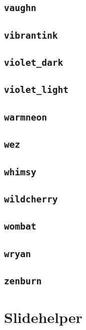 \subsection{\texttt{vaughn}}
\newpage
\subsection{\texttt{vibrantink}}
\newpage
\subsection{\texttt{violet\_dark}}
\newpage
\subsection{\texttt{violet\_light}}
\newpage
\subsection{\texttt{warmneon}}
\newpage
\subsection{\texttt{wez}}
\newpage
\subsection{\texttt{whimsy}}
\newpage
\subsection{\texttt{wildcherry}}
\newpage
\subsection{\texttt{wombat}}
\newpage
\subsection{\texttt{wryan}}
\newpage
\subsection{\texttt{zenburn}}
\newpage

\section{Slidehelper}

